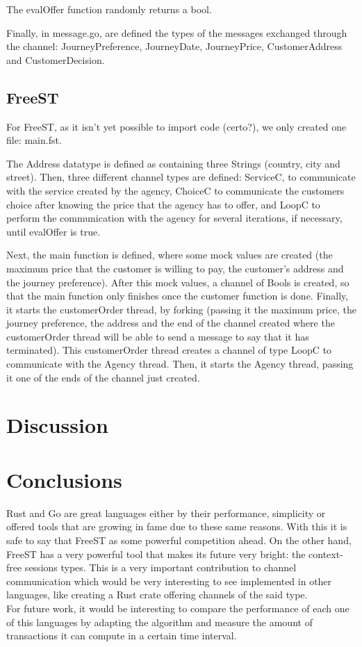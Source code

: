\documentclass[runningheads]{llncs}
\begin{document}
The evalOffer function randomly returns a bool. 

Finally, in message.go, are defined the types of the messages exchanged through the channel: JourneyPreference, JourneyDate, JourneyPrice, CustomerAddress and CustomerDecision. 
\subsection{FreeST}

For FreeST, as it isn't yet possible to import code (certo?), we only created one file: main.fst.

The Address datatype is defined as containing three Strings (country, city and street). Then, three different channel types are defined: ServiceC, to communicate with the service created by the agency, ChoiceC to communicate the customers choice after knowing the price that the agency has to offer, and LoopC to perform the communication with the agency for several iterations, if necessary, until evalOffer is true.

Next, the main function is defined, where some mock values are created (the maximum price that the customer is willing to pay, the customer's address and the journey preference). After this mock values, a channel of Bools is created, so that the main function only finishes once the customer function is done. Finally, it starts the customerOrder thread, by forking (passing it the maximum price, the journey preference, the address and the end of the channel created where the customerOrder thread will be able to send a message to say that it has terminated). This customerOrder thread creates a channel of type LoopC to communicate with the Agency thread. Then, it starts the Agency thread, passing it one of the ends of the channel just created.


\lipsum[1]
\section{Discussion}
\section{Conclusions}
Rust and Go are great languages either by their performance, simplicity or offered tools that are growing in fame due to these same reasons. With this it is safe to say that FreeST as some powerful competition ahead. On the other hand, FreeST has a very powerful tool that makes its future very bright: the context-free sessions types.
This is a very important contribution to channel communication which would be very interesting to see implemented in other languages, like creating a Rust crate offering channels of the said type.
\\For future work, it would be interesting to compare the performance of each one of this languages by adapting the algorithm and measure the amount of transactions it can compute in a certain time interval.
\end{document}
